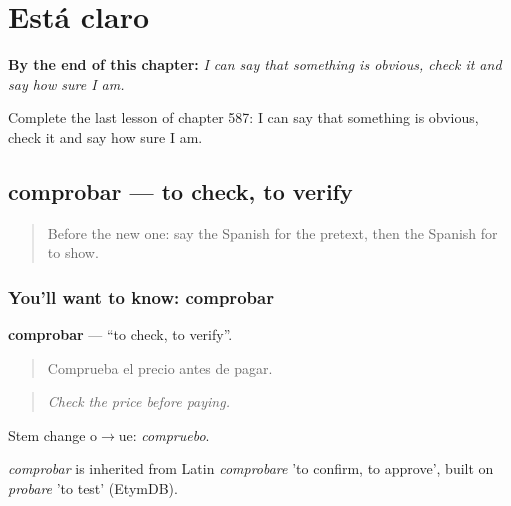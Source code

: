 
\chapter{Está claro}
\label{ch:es-esta-claro}

\begin{chapteropening}
\textbf{By the end of this chapter:} \emph{I can say that something is obvious, check it and say how sure I am.}

Complete the last lesson of chapter 587: I can say that something is obvious, check it and say how sure I am.
\end{chapteropening}

\section[comprobar]{comprobar — to check, to verify}

\label{lesson:ES-C587-comprobar}



\begin{quote}
Before the new one: say the Spanish for the pretext, then the Spanish for to show.
\end{quote}

\subsection*{You'll want to know: comprobar}
\textbf{comprobar} — \textquotedblleft{}to check, to verify\textquotedblright{}.

\begin{quote}
Comprueba el precio antes de pagar.
\end{quote}

\begin{quote}
\emph{Check the price before paying.}
\end{quote}

Stem change o$\to$ue: \emph{compruebo}.

\begin{cousinweb}
\emph{comprobar} is inherited from Latin \emph{comprobare} 'to confirm, to approve', built on \emph{probare} 'to test' (EtymDB).
\end{cousinweb}

